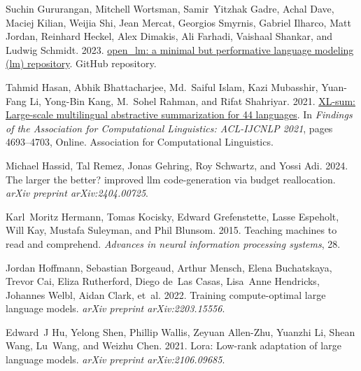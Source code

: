 \documentclass[11pt]{article}
\begin{document}
\begin{thebibliography}{88}
    Suchin Gururangan, Mitchell Wortsman, Samir~Yitzhak Gadre, Achal Dave, Maciej Kilian, Weijia Shi, Jean Mercat, Georgios Smyrnis, Gabriel Ilharco, Matt Jordan, Reinhard Heckel, Alex Dimakis, Ali Farhadi, Vaishaal Shankar, and Ludwig Schmidt. 2023.
    \newblock \href {https://github.com/mlfoundations/open_lm/} {{open\_lm}: a minimal but performative language modeling (lm) repository}.
    \newblock GitHub repository.
    
    Tahmid Hasan, Abhik Bhattacharjee, Md.~Saiful Islam, Kazi Mubasshir, Yuan-Fang Li, Yong-Bin Kang, M.~Sohel Rahman, and Rifat Shahriyar. 2021.
    \newblock \href {https://doi.org/10.18653/v1/2021.findings-acl.413} {{XL}-sum: Large-scale multilingual abstractive summarization for 44 languages}.
    \newblock In \emph{Findings of the Association for Computational Linguistics: ACL-IJCNLP 2021}, pages 4693--4703, Online. Association for Computational Linguistics.
    
    Michael Hassid, Tal Remez, Jonas Gehring, Roy Schwartz, and Yossi Adi. 2024.
    \newblock The larger the better? improved llm code-generation via budget reallocation.
    \newblock \emph{arXiv preprint arXiv:2404.00725}.
    
    Karl~Moritz Hermann, Tomas Kocisky, Edward Grefenstette, Lasse Espeholt, Will Kay, Mustafa Suleyman, and Phil Blunsom. 2015.
    \newblock Teaching machines to read and comprehend.
    \newblock \emph{Advances in neural information processing systems}, 28.
    
    Jordan Hoffmann, Sebastian Borgeaud, Arthur Mensch, Elena Buchatskaya, Trevor Cai, Eliza Rutherford, Diego de~Las Casas, Lisa~Anne Hendricks, Johannes Welbl, Aidan Clark, et~al. 2022.
    \newblock Training compute-optimal large language models.
    \newblock \emph{arXiv preprint arXiv:2203.15556}.
    
    Edward~J Hu, Yelong Shen, Phillip Wallis, Zeyuan Allen-Zhu, Yuanzhi Li, Shean Wang, Lu~Wang, and Weizhu Chen. 2021.
    \newblock Lora: Low-rank adaptation of large language models.
    \newblock \emph{arXiv preprint arXiv:2106.09685}.
    

\end{thebibliography}
\end{document}
